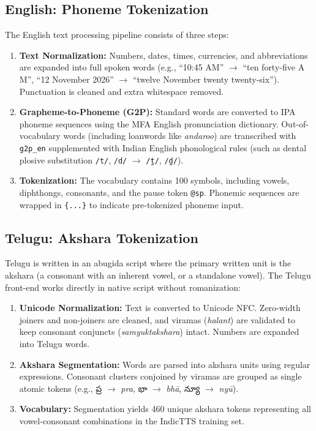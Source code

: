 \documentclass[11pt,a4paper]{report}
\newcommand{\texttelugu}[1]{{\telugufont #1}}
\begin{document}
\subsection{English: Phoneme Tokenization}
The English text processing pipeline consists of three steps:
\begin{enumerate}
    \item \textbf{Text Normalization:} Numbers, dates, times, currencies, and abbreviations are expanded into full spoken words (e.g., ``10:45 AM'' $\to$ ``ten forty-five A M'', ``12 November 2026'' $\to$ ``twelve November twenty twenty-six''). Punctuation is cleaned and extra whitespace removed.
    \item \textbf{Grapheme-to-Phoneme (G2P):} Standard words are converted to IPA phoneme sequences using the MFA English pronunciation dictionary. Out-of-vocabulary words (including loanwords like \textit{andaroo}) are transcribed with \texttt{g2p\_en} supplemented with Indian English phonological rules (such as dental plosive substitution \texttt{/t/}, \texttt{/d/} $\to$ \texttt{/t̪/}, \texttt{/d̪/}).
    \item \textbf{Tokenization:} The vocabulary contains 100 symbols, including vowels, diphthongs, consonants, and the pause token \texttt{@sp}. Phonemic sequences are wrapped in \texttt{\{...\}} to indicate pre-tokenized phoneme input.
\end{enumerate}

\subsection{Telugu: Akshara Tokenization}
Telugu is written in an abugida script where the primary written unit is the akshara (a consonant with an inherent vowel, or a standalone vowel). The Telugu front-end works directly in native script without romanization:
\begin{enumerate}
    \item \textbf{Unicode Normalization:} Text is converted to Unicode NFC. Zero-width joiners and non-joiners are cleaned, and viramas (\textit{halant}) are validated to keep consonant conjuncts (\textit{samyuktakshara}) intact. Numbers are expanded into Telugu words.
    \item \textbf{Akshara Segmentation:} Words are parsed into akshara units using regular expressions. Consonant clusters conjoined by viramas are grouped as single atomic tokens (e.g., \texttelugu{ప్ర} $\to$ \textit{pra}, \texttelugu{భా} $\to$ \textit{bhā}, \texttelugu{న్యూ} $\to$ \textit{nyū}).
    \item \textbf{Vocabulary:} Segmentation yields 460 unique akshara tokens representing all vowel-consonant combinations in the IndicTTS training set.
\end{enumerate}
\end{document}
